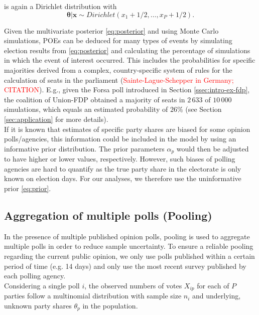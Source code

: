 \documentclass[smallcondensed]{svjour3}     %
\begin{document}
is again a Dirichlet distribution with
\begin{equation}\label{eq:posterior}
\boldsymbol{\theta}|\mathbf{x} \sim Dirichlet(x_1 + 1/2,\ldots, x_P + 1/2).
\end{equation}

Given the multivariate posterior \eqref{eq:posterior} and using Monte Carlo
simulations, POEs can be deduced for many types of events by simulating
election results from \eqref{eq:posterior} and calculating the percentage of
simulations in which the event of interest occurred. This includes the
probabilities for specific majorities derived from a complex, country-specific
system of rules for the calculation of seats in the parliament
(\textcolor{red}{Sainte-Lague-Schepper in Germany; CITATION}). E.g., given the Forsa poll
introduced in Section \ref{ssec:intro-ex-fdp}, the coalition of Union-FDP
obtained a majority of seats in $2\,633$ of $10\,000$ simulations, which equals
an estimated probability of $26\%$ (see Section \ref{sec:application} for
more details).\\

If it is known that estimates of specific party shares are biased for some opinion
polls/agencies, this information could be included in the model by using an
informative prior distribution. The prior parameters $\alpha_p$ would then
be adjusted to have higher or lower values, respectively.
However, such biases of polling agencies are hard to quantify as the true party
share in the electorate is only known on election days. For our analyses, we
therefore use the uninformative prior \eqref{eq:prior}.

\subsection{Aggregation of multiple polls (Pooling)} \label{ssec:pooling}
In the presence of multiple published opinion polls, pooling is used to
aggregate multiple polls in order to reduce sample uncertainty. To ensure a
reliable pooling regarding the current public opinion, we only use polls
published within a certain period of time (e.g. 14 days)  and only use the most recent survey published by each polling agency.\\

Considering a single poll $i$, the observed numbers of votes $X_{ip}$ for each of
$P$ parties follow a multinomial distribution with sample size $n_i$ and underlying,
unknown party shares $\theta_p$ in the population.
\end{document}
